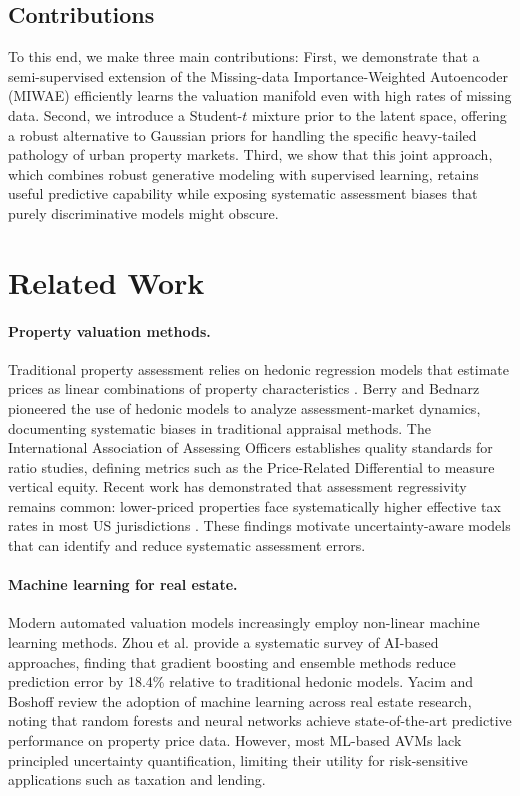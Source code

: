 \documentclass{article}
\begin{document}
\subsection{Contributions}
To this end, we make three main contributions: First, we demonstrate that a semi-supervised extension of the Missing-data Importance-Weighted Autoencoder (MIWAE) \cite{mattei2019miwae} efficiently learns the valuation manifold even with high rates of missing data. Second, we introduce a Student-$t$ mixture prior to the latent space, offering a robust alternative to Gaussian priors for handling the specific heavy-tailed pathology of urban property markets. Third, we show that this joint approach, which combines robust generative modeling with supervised learning, retains useful predictive capability while exposing systematic assessment biases that purely discriminative models might obscure.


\section{Related Work}

\paragraph{Property valuation methods.} Traditional property assessment relies on hedonic regression models that estimate prices as linear combinations of property characteristics \cite{berry1975hedonic, iaao2013standard}. Berry and Bednarz \cite{berry1975hedonic} pioneered the use of hedonic models to analyze assessment-market dynamics, documenting systematic biases in traditional appraisal methods. The International Association of Assessing Officers \cite{iaao2013standard} establishes quality standards for ratio studies, defining metrics such as the Price-Related Differential to measure vertical equity. Recent work has demonstrated that assessment regressivity remains common: lower-priced properties face systematically higher effective tax rates in most US jurisdictions \cite{coombes2021assessment, brough_equity_2023}. These findings motivate uncertainty-aware models that can identify and reduce systematic assessment errors.

\paragraph{Machine learning for real estate.} Modern automated valuation models increasingly employ non-linear machine learning methods. Zhou et al. \cite{zhou2023ai} provide a systematic survey of AI-based approaches, finding that gradient boosting and ensemble methods reduce prediction error by 18.4\% relative to traditional hedonic models. Yacim and Boshoff \cite{yacim2023use} review the adoption of machine learning across real estate research, noting that random forests and neural networks achieve state-of-the-art predictive performance on property price data. However, most ML-based AVMs lack principled uncertainty quantification, limiting their utility for risk-sensitive applications such as taxation and lending.
\end{document}
